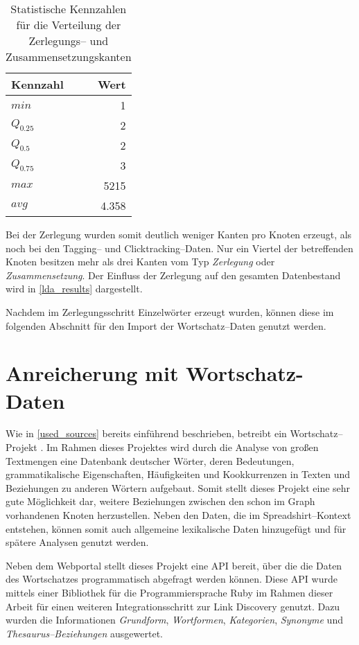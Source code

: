 \begin{table}[h]
\centering
\begin{tabular}{lr}
    \toprule
    Kennzahl & Wert \\
    \midrule
    \(min\) & \num{1} \\
    \(Q_{0.25}\) & \num{2} \\
    \(Q_{0.5}\) & \num{2} \\
    \(Q_{0.75}\) & \num{3} \\
    \(max\) &  \num{5215} \\
    \(avg\) &  \num{4,358} \\
    \bottomrule
\end{tabular}
\caption{Statistische Kennzahlen für die Verteilung der Zerlegungs-- und Zusammensetzungskanten}
\label{tab:only_decomposition}
\end{table}

Bei der Zerlegung wurden somit deutlich weniger Kanten pro Knoten erzeugt, als noch bei den Tagging-- und Clicktracking--Daten. Nur ein Viertel der betreffenden Knoten besitzen mehr als drei Kanten vom Typ \emph{Zerlegung} oder \emph{Zusammensetzung}. Der Einfluss der Zerlegung auf den gesamten Datenbestand wird in \cref{lda_results} dargestellt.

Nachdem im Zerlegungsschritt Einzelwörter erzeugt wurden, können diese im folgenden Abschnitt für den Import der Wortschatz--Daten genutzt werden.

\section{Anreicherung mit Wortschatz-Daten}
\label{wortschatz}

Wie in \cref{used_sources} bereits einführend beschrieben, betreibt ein Wortschatz--Projekt \cite{ws2013}. Im Rahmen dieses Projektes wird durch die Analyse von großen Textmengen eine Datenbank deutscher Wörter, deren Bedeutungen, grammatikalische Eigenschaften, Häufigkeiten und Kookkurrenzen in Texten und Beziehungen zu anderen Wörtern aufgebaut. Somit stellt dieses Projekt eine sehr gute Möglichkeit dar, weitere Beziehungen zwischen den schon im Graph vorhandenen Knoten herzustellen. Neben den Daten, die im Spreadshirt--Kontext entstehen, können somit auch allgemeine lexikalische Daten hinzugefügt und für spätere Analysen genutzt werden.

Neben dem Webportal stellt dieses Projekt eine API bereit, über die die Daten des Wortschatzes programmatisch abgefragt werden können. Diese API wurde mittels einer Bibliothek für die Programmiersprache Ruby \cite{wlapi2013} im Rahmen dieser Arbeit für einen weiteren Integrationsschritt zur Link Discovery genutzt. Dazu wurden die Informationen \emph{Grundform}, \emph{Wortformen}, \emph{Kategorien}, \emph{Synonyme} und \emph{Thesaurus--Beziehungen} ausgewertet.

